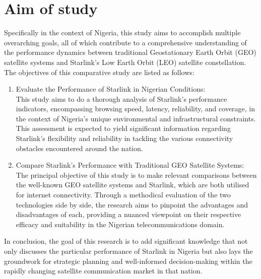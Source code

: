 \section{Aim of study}
Specifically in the context of Nigeria, this study aims to accomplish multiple overarching goals, all of which contribute to a comprehensive understanding of the performance dynamics between traditional Geostationary Earth Orbit (GEO) satellite systems and Starlink's Low Earth Orbit (LEO) satellite constellation.
The objectives of this comparative study are listed as follows:
\begin{enumerate}

\item  Evaluate the Performance of Starlink in Nigerian Conditions:\\
This study aims to do a thorough analysis of Starlink's performance indicators, encompassing browsing speed, latency, reliability, and coverage, in the context of Nigeria's unique environmental and infrastructural constraints. This assessment is expected to yield significant information regarding Starlink's flexibility and reliability in tackling the various connectivity obstacles encountered around the nation.

\item Compare Starlink's Performance with Traditional GEO Satellite Systems:\\
The principal objective of this study is to make relevant comparisons between the well-known GEO satellite systems and Starlink, which are both utilised for internet connectivity. Through a methodical evaluation of the two technologies side by side, the research aims to pinpoint the advantages and disadvantages of each, providing a nuanced viewpoint on their respective efficacy and suitability in the Nigerian telecommunications domain.
\end{enumerate}

In conclusion, the goal of this research is to add significant knowledge that not only discusses the particular performance of Starlink in Nigeria but also lays the groundwork for strategic planning and well-informed decision-making within the rapidly changing satellite communication market in that nation.


